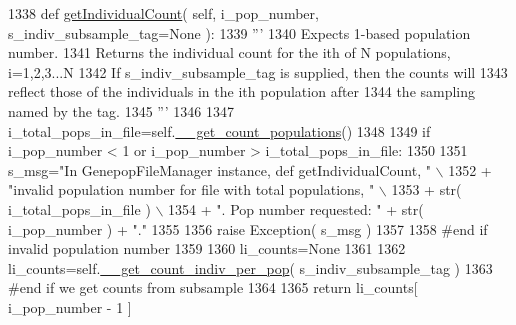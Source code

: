 \begin{DoxyCode}
1338     \textcolor{keyword}{def }\hyperlink{classnegui_1_1genepopfilemanager_1_1GenepopFileManager_a05e723069f5129b21a4d017c2a5317b0}{getIndividualCount}( self, i\_pop\_number, s\_indiv\_subsample\_tag=None ):
1339         \textcolor{stringliteral}{'''}
1340 \textcolor{stringliteral}{        Expects 1-based population number.}
1341 \textcolor{stringliteral}{        Returns the individual count for the ith of N populations, i=1,2,3...N}
1342 \textcolor{stringliteral}{        If s\_indiv\_subsample\_tag is supplied, then the counts will}
1343 \textcolor{stringliteral}{        reflect those of the individuals in the ith population after}
1344 \textcolor{stringliteral}{        the sampling named by the tag.}
1345 \textcolor{stringliteral}{        '''}
1346 
1347         i\_total\_pops\_in\_file=self.\hyperlink{classnegui_1_1genepopfilemanager_1_1GenepopFileManager_a51f6dcbd17c80f8e61114b11283b655f}{\_\_get\_count\_populations}()  
1348 
1349         \textcolor{keywordflow}{if} i\_pop\_number < 1 \textcolor{keywordflow}{or} i\_pop\_number > i\_total\_pops\_in\_file:
1350 
1351             s\_msg=\textcolor{stringliteral}{"In GenepopFileManager instance, def getIndividualCount, "} \(\backslash\)
1352                     + \textcolor{stringliteral}{"invalid population number for file with total populations, "} \(\backslash\)
1353                     + str( i\_total\_pops\_in\_file ) \(\backslash\)
1354                     + \textcolor{stringliteral}{".  Pop number requested: "} + str( i\_pop\_number ) + \textcolor{stringliteral}{"."}
1355 
1356             \textcolor{keywordflow}{raise} Exception( s\_msg )
1357 
1358         \textcolor{comment}{#end if  invalid population number}
1359 
1360         li\_counts=\textcolor{keywordtype}{None}
1361 
1362         li\_counts=self.\hyperlink{classnegui_1_1genepopfilemanager_1_1GenepopFileManager_a8efe11151549d7da2bc024f836491af4}{\_\_get\_count\_indiv\_per\_pop}( s\_indiv\_subsample\_tag )
1363         \textcolor{comment}{#end if we get counts from subsample}
1364 
1365         \textcolor{keywordflow}{return} li\_counts[ i\_pop\_number - 1 ]
\end{DoxyCode}
